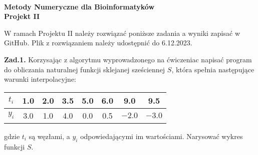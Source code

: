 \documentclass[12pt]{report}
\begin{document}
{
\begin{center}
\textbf
{
\small\textsf{\\ Metody Numeryczne dla Bioinformatyk\'ow\\ Projekt II 
}
}\end{center}
}
\noindent
W ramach Projektu II nale\.zy rozwi\k{a}za\'c poni\.zsze zadania a wyniki zapisa\'c w GitHub. Plik z rozwi\k{a}zaniem nale\.zy udost\k{e}pni\'c do 6.12.2023. 

\vspace{5mm}
\noindent
{\bf Zad.1.} Korzysaj\k{a}c z algorytmu wyprowadzonego na \'cwiczeniac napisa\'c program do obliczania naturalnej funkcji sklejanej sze\'sciennej $S$, kt\'ora spe\l{}nia nast\k{e}puj\k{a}ce warunki interpolacyjne:

\vspace{3mm}
{\center

\begin{tabular}{|c|c|c|c|c|c|c|c|}
\hline
$t_i$ & 1.0 & 2.0 & 3.5 & 5.0 & 6.0 & 9.0 & 9.5 \\
\hline
$y_i$ & 3.0 & 1.0 & 4.0 & 0.0 & 0.5 & $-2.0$ & $-3.0$\\
\hline
\end{tabular}

}
\vspace{3mm}

\vspace{5mm}
\noindent
gdzie $t_i$ s\k{a} w\k{e}z\l{}ami, a $y_i$ odpowiedaj\k{a}cymi im warto\'sciami. Narysowa\'c wykres funkcji $S$.
\end{document}
